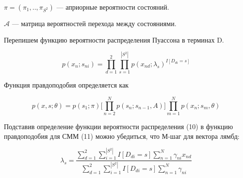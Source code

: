 \documentclass{matmex-diploma-custom}
\begin{document}
$\pi = (\pi_1,..,\pi_{S^2})$ --- априорные вероятности состояний.
    
$\mathcal{A}$ --- матрица вероятностей перехода между состояниями.

Перепишем функцию вероятности распределения Пуассона в терминах D.

\begin{equation}p(x_n;s_{ni}) = \prod\limits_{d = 1}^2 \prod\limits_{s = 1}^{|S^2|} p(x_{nd};\lambda_s)^{I[D_{di} = s]}\end{equation}

Функция правдоподобия определяется как

\begin{equation}p(x,s;\theta) = p(s_1;\pi)\bigg[\prod_{n=2}^N p(s_n;s_{n-1},A)\bigg]\prod_{m=1}^N p(x_n;s_m,\theta)\end{equation}

Подставив определение функции вероятности распределения (10) в функцию правдоподобия для СММ (11) можно убедиться, что М-шаг для вектора лямбд:

\begin{equation}\lambda_s = \frac{\sum\limits_{d = 1}^2 \sum\limits_{i = 1}^{|S^2|} I[D_{di} = s] \sum\limits_{n = 1}^N \gamma_{ni} x_{nd}}
                 {\sum\limits_{d = 1}^2 \sum\limits_{i = 1}^{|S^2|} I[D_{di} = s] \sum\limits_{n = 1}^N \gamma_{ni}}\end{equation}
\end{document}
